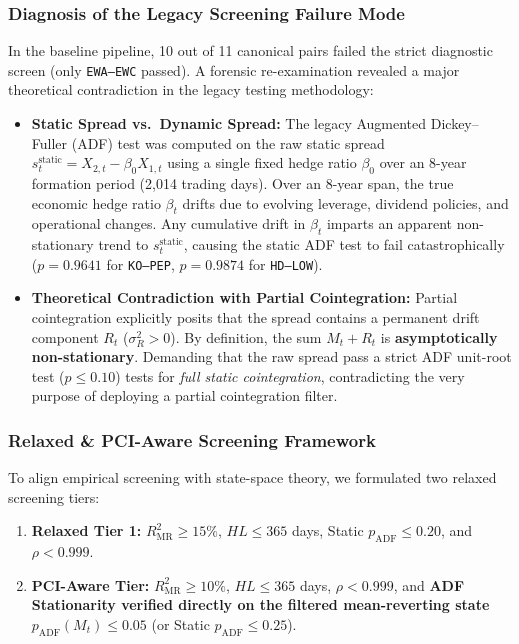 \documentclass[11pt, a4paper]{article}
\begin{document}
\subsubsection{Diagnosis of the Legacy Screening Failure Mode}
In the baseline pipeline, 10 out of 11 canonical pairs failed the strict diagnostic screen (only \texttt{EWA--EWC} passed). A forensic re-examination revealed a major theoretical contradiction in the legacy testing methodology:
\begin{itemize}
    \item \textbf{Static Spread vs.\ Dynamic Spread:} The legacy Augmented Dickey--Fuller (ADF) test was computed on the raw static spread $s_t^{\text{static}} = X_{2,t} - \beta_0 X_{1,t}$ using a single fixed hedge ratio $\beta_0$ over an 8-year formation period (2,014 trading days). Over an 8-year span, the true economic hedge ratio $\beta_t$ drifts due to evolving leverage, dividend policies, and operational changes. Any cumulative drift in $\beta_t$ imparts an apparent non-stationary trend to $s_t^{\text{static}}$, causing the static ADF test to fail catastrophically ($p = 0.9641$ for \texttt{KO--PEP}, $p = 0.9874$ for \texttt{HD--LOW}).
    \item \textbf{Theoretical Contradiction with Partial Cointegration:} Partial cointegration explicitly posits that the spread contains a permanent drift component $R_t$ ($\sigma_R^2 > 0$). By definition, the sum $M_t + R_t$ is \textbf{asymptotically non-stationary}. Demanding that the raw spread pass a strict ADF unit-root test ($p \le 0.10$) tests for \textit{full static cointegration}, contradicting the very purpose of deploying a partial cointegration filter.
\end{itemize}

\subsubsection{Relaxed \& PCI-Aware Screening Framework}
To align empirical screening with state-space theory, we formulated two relaxed screening tiers:
\begin{enumerate}
    \item \textbf{Relaxed Tier 1:} $R^2_{\text{MR}} \ge 15\%$, $HL \le 365$ days, Static $p_{\text{ADF}} \le 0.20$, and $\rho < 0.999$.
    \item \textbf{PCI-Aware Tier:} $R^2_{\text{MR}} \ge 10\%$, $HL \le 365$ days, $\rho < 0.999$, and \textbf{ADF Stationarity verified directly on the filtered mean-reverting state} $p_{\text{ADF}}(M_t) \le 0.05$ (or Static $p_{\text{ADF}} \le 0.25$).
\end{enumerate}
\end{document}
